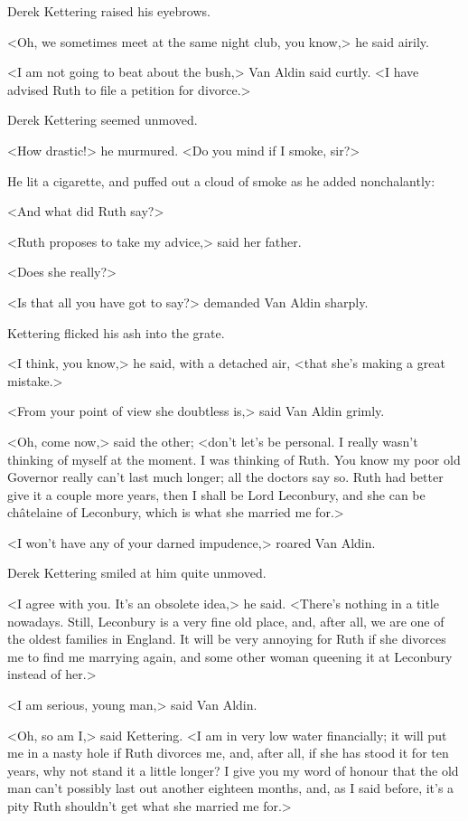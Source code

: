 Derek Kettering raised his eyebrows.

<Oh, we sometimes meet at the same night club, you know,> he said airily.

<I am not going to beat about the bush,> Van Aldin said curtly. <I have advised Ruth to file a petition for divorce.>

Derek Kettering seemed unmoved.

<How drastic!> he murmured. <Do you mind if I smoke, sir?>

He lit a cigarette, and puffed out a cloud of smoke as he added nonchalantly:

<And what did Ruth say?>

<Ruth proposes to take my advice,> said her father.

<Does she really?>

<Is that all you have got to say?> demanded Van Aldin sharply.

Kettering flicked his ash into the grate.

<I think, you know,> he said, with a detached air, <that she's making a great mistake.>

<From your point of view she doubtless is,> said Van Aldin grimly.

<Oh, come now,> said the other; <don't let's be personal. I really wasn't thinking of myself at the moment. I was thinking of Ruth. You know my poor old Governor really can't last much longer; all the doctors say so. Ruth had better give it a couple more years, then I shall be Lord Leconbury, and she can be châtelaine of Leconbury, which is what she married me for.>

<I won't have any of your darned impudence,> roared Van Aldin.

Derek Kettering smiled at him quite unmoved.

<I agree with you. It's an obsolete idea,> he said. <There's nothing in a title nowadays. Still, Leconbury is a very fine old place, and, after all, we are one of the oldest families in England. It will be very annoying for Ruth if she divorces me to find me marrying again, and some other woman queening it at Leconbury instead of her.>

<I am serious, young man,> said Van Aldin.

<Oh, so am I,> said Kettering. <I am in very low water financially; it will put me in a nasty hole if Ruth divorces me, and, after all, if she has stood it for ten years, why not stand it a little longer? I give you my word of honour that the old man can't possibly last out another eighteen months, and, as I said before, it's a pity Ruth shouldn't get what she married me for.>

